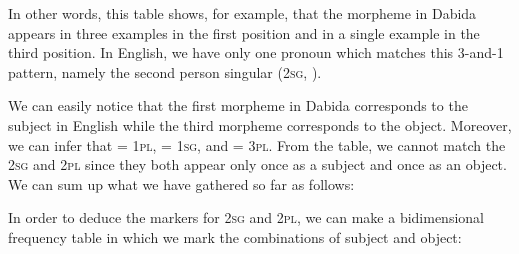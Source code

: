 \begin{refsection}
\begin{mysolution}
 In other words, this table shows, for example, that the morpheme  in Dabida appears in three examples in the first position and in a single example in the third position. In English, we have only one pronoun which matches this 3-and-1 pattern, namely the second person singular (2\textsc{sg}, ).

We can easily notice that the first morpheme in Dabida corresponds to the subject in English while the third morpheme corresponds to the object. Moreover, we can infer that  = 1\textsc{pl},  = 1\textsc{sg}, and  = 3\textsc{pl}. From the table, we cannot match the 2\textsc{sg} and 2\textsc{pl} since they both appear only once as a subject and once as an object. We can sum up what we have gathered so far as follows:


In order to deduce the markers for 2\textsc{sg} and 2\textsc{pl}, we can make a bidimensional frequency table in which we mark the combinations of subject and object:

\begin{table}[H]
  \begin{floatrow}
  \end{floatrow}
\end{table}


\end{mysolution}
\end{refsection}
